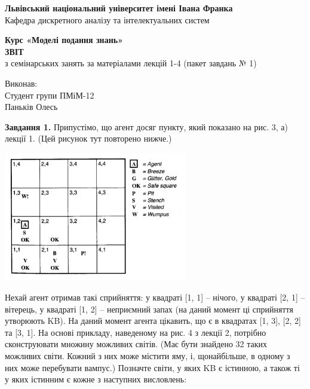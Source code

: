 \documentclass[a4paper,14pt]{extarticle} %
\begin{document}
\thispagestyle{empty}

\begin{center}
    \textbf{Львівський національний університет імені Івана Франка}\\[1ex]
    Кафедра дискретного аналізу та інтелектуальних систем
\end{center}

\vspace{5cm} %

\begin{center}
    \Large\textbf{Курс «Моделі подання знань»}\\[4ex]
    \huge\textbf{ЗВІТ}\\[3ex]
    \Large з семінарських занять за матеріалами лекцій 1-4 (пакет завдань № 1)
\end{center}

\vspace{2cm}
\begin{flushright}
    Виконав:\\
    Студент групи ПМіМ-12\\
    Паньків Олесь
\end{flushright}


\newpage
\pagestyle{plain}

\textbf{Завдання 1.} Припустімо, що агент досяг пункту, який показано на рис. 3,
а) лекції 1. (Цей рисунок тут повторено нижче.)

\includegraphics[width=0.6\textwidth]{resources/wampus-world-001.png}

Нехай агент отримав такі сприйняття: у квадраті [1, 1] – нічого, у квадраті [2, 1] –
вітерець, у квадраті [1, 2] – неприємний запах (на даний момент ці сприйняття утворюють
KB). На даний момент агента цікавить, що є в квадратах [1, 3], [2, 2] та [3, 1]. На основі
прикладу, наведеному на рис. 4 з лекції 2, потрібно сконструювати множину можливих
світів. (Має бути знайдено 32 таких можливих світи. Кожний з них може містити яму, і,
щонайбільше, в одному з них може перебувати вампус.) Позначте світи, у яких KB є
істинною, а також ті у яких істинним є кожне з наступних висловлень:
\end{document}
